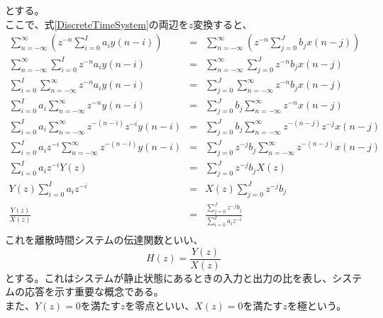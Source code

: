 \documentclass[a4paper]{jsarticle}
\begin{document}
とする。\\
ここで、式\ref{DiscreteTimeSystem}の両辺を$z$変換すると、
\begin{eqnarray}
	\sum _{ n = - \infty } ^\infty \left( z^{-n} \sum _{ i = 0} ^I a_i y \left( n - i \right) \right) & = & \sum _{ n = - \infty } ^\infty \left( z^{-n} \sum _{ j = 0} ^J b_j x \left( n - j \right) \right) \nonumber \\
	\sum _{ n = - \infty } ^\infty \sum _{ i = 0} ^I z^{ -n } a_i y \left( n - i \right) & = & \sum _{ n = - \infty } ^\infty \sum _{ j = 0} ^J z ^{ -n } b_j x \left( n - j \right) \nonumber \\
	\sum _{ i = 0} ^I \sum _{ n = - \infty } ^\infty z ^{ -n } a_i y \left( n - i \right) & = & \sum _{ j = 0} ^J \sum _{ n = - \infty } ^\infty z ^{ -n } b_j x \left( n - j \right) \nonumber \\
	\sum _{ i = 0} ^I a_i \sum _{ n = - \infty } ^\infty z ^{ -n } y \left( n - i \right) & = & \sum _{ j = 0} ^J b_j \sum _{ n = - \infty } ^\infty z ^{ -n } x \left( n - j \right) \nonumber \\
	\sum _{ i = 0} ^I a_i \sum _{ n = - \infty } ^\infty z ^{ - \left( n - i \right) } z ^{ -i } y \left( n - i \right) & = & \sum _{ j = 0} ^J b_j \sum _{ n = - \infty } ^\infty z ^{ - \left( n - j \right) } z ^{ -j } x \left( n - j \right) \nonumber \\
	\sum _{ i = 0} ^I a_i z ^{ -i } \sum _{ n = - \infty } ^\infty z ^{ - \left( n - i \right) } y \left( n - i \right) & = & \sum _{ j = 0} ^J z ^{ -j } b_j \sum _{ n = - \infty } ^\infty z ^{ - \left( n - j \right) } x \left( n - j \right) \nonumber \\
	\sum _{ i = 0} ^I a_i z ^{ -i } Y \left( z \right) & = & \sum _{ j = 0} ^J z ^{ -j } b_j X \left( z \right) \nonumber \\
	Y \left( z \right) \sum _{ i = 0} ^I a_i z ^{ -i } & = & X \left( z \right) \sum _{ j = 0} ^J z ^{ -j } b_j \nonumber \\
	\frac { Y \left( z \right) } { X \left( z \right) } & = & \frac { \sum _{ j = 0} ^J z ^{ -j } b_j } { \sum _{ i = 0} ^I a_i z ^{ -i } } \nonumber \\
\end{eqnarray}
これを離散時間システムの伝達関数といい、
\begin{equation}
H \left( z \right) = \frac { Y \left( z \right) } { X \left( z \right) }
\end{equation}
とする。これはシステムが静止状態にあるときの入力と出力の比を表し、システムの応答を示す重要な概念である。\\
また、$ Y \left( z \right) = 0 $を満たす$z$を零点といい、$ X \left( z \right) = 0 $を満たす$z$を極という。
\end{document}
